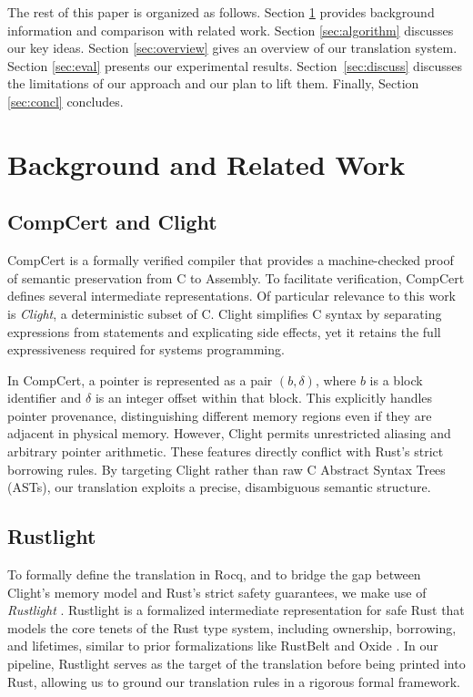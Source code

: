 \documentclass{llncs} %
\begin{document}
The rest of this paper is organized as follows. Section \ref{sec:background} provides background information and comparison with related work. Section \ref{sec:algorithm} discusses our key ideas. Section \ref{sec:overview} gives an overview of our translation system. Section \ref{sec:eval} presents our experimental results. Section~\ref{sec:discuss} discusses the limitations of our approach and our plan to lift them. Finally, Section \ref{sec:concl} concludes.
%


\section{Background and Related Work}
\label{sec:background}


\subsection{CompCert and Clight}
CompCert \cite{Leroy2009} is a formally verified compiler that provides a machine-checked proof of semantic preservation from C to Assembly. To facilitate verification, CompCert defines several intermediate representations. Of particular relevance to this work is \emph{Clight}, a deterministic subset of C. Clight simplifies C syntax by separating expressions from statements and explicating side effects, yet it retains the full expressiveness required for systems programming.

In CompCert, a pointer is represented as a pair $(b, \delta)$, where $b$ is a block identifier and $\delta$ is an integer offset within that block. This explicitly handles pointer provenance, distinguishing different memory regions even if they are adjacent in physical memory. However, Clight permits unrestricted aliasing and arbitrary pointer arithmetic. These features directly conflict with Rust's strict borrowing rules. By targeting Clight rather than raw C Abstract Syntax Trees (ASTs), our translation exploits a precise, disambiguous semantic structure.%

\subsection{Rustlight}
To formally define the translation in Rocq, and to bridge the gap between Clight's memory model and Rust's strict safety guarantees, we make use of \emph{Rustlight} \cite{Wu2025}. Rustlight is a formalized intermediate representation for safe Rust that models the core tenets of the Rust type system, including ownership, borrowing, and lifetimes, similar to prior formalizations like RustBelt \cite{Jung2017} and Oxide \cite{Weiss2019}. In our pipeline, Rustlight serves as the target of the translation before being printed into Rust, allowing us to ground our translation rules in a rigorous formal framework.
\end{document}
